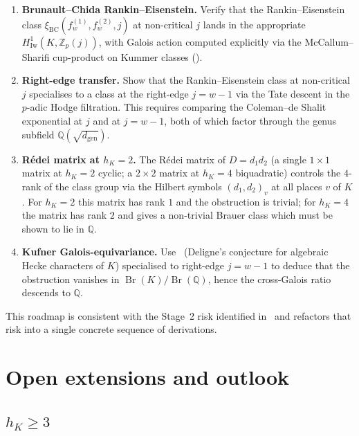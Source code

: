 \documentclass[11pt,a4paper]{amsart}
\theoremstyle{plain}
\theoremstyle{definition}
\DeclareMathOperator{\Br}{Br}
\newcommand{\Q}{\mathbb{Q}}
\newcommand{\fl}[2]{f_{#1}^{(#2)}}
\newcommand{\dgen}{d_{\mathrm{gen}}}
\begin{document}
\begin{enumerate}[leftmargin=2em]
\item \textbf{Brunault--Chida Rankin--Eisenstein.} Verify that the
  Rankin--Eisenstein class
  $\xi_{\mathrm{BC}}(\fl{w}{1}, \fl{w}{2}, j)$ at non-critical $j$
  lands in the appropriate $H^1_{\mathrm{Iw}}(K, \mathbb{Z}_p(j))$, with
  Galois action computed explicitly via the McCallum--Sharifi cup-product
  on Kummer classes (\cite[\S 5.2]{BrunaultChida2015}).
\item \textbf{Right-edge transfer.} Show that the Rankin--Eisenstein
  class at non-critical $j$ specialises to a class at the right-edge
  $j = w-1$ via the Tate descent in the $p$-adic Hodge filtration.
  This requires comparing the Coleman--de Shalit
  exponential at $j$ and at $j = w-1$, both of which factor
  through the genus subfield $\Q(\sqrt{\dgen})$.
\item \textbf{R\'edei matrix at $h_K = 2$.} The R\'edei matrix of
  $D = d_1 d_2$ (a single $1 \times 1$ matrix at $h_K = 2$ cyclic; a
  $2 \times 2$ matrix at $h_K = 4$ biquadratic) controls the
  $4$-rank of the class group via the Hilbert symbols
  $(d_1, d_2)_v$ at all places $v$ of $K$.  For $h_K = 2$ this matrix
  has rank $1$ and the obstruction is trivial; for $h_K = 4$ the matrix
  has rank $2$ and gives a non-trivial Brauer class which must be
  shown to lie in $\Q$.
\item \textbf{Kufner Galois-equivariance.} Use~\cite[Thm.~2.3]{Kufner2024}
  (Deligne's conjecture for algebraic Hecke characters of $K$)
  specialised to right-edge $j = w-1$ to deduce that the obstruction
  vanishes in $\Br(K) / \Br(\Q)$, hence the cross-Galois ratio descends
  to $\Q$.
\end{enumerate}

This roadmap is consistent with the Stage~2 risk identified
in~\cite[\S 6]{Remondiere2026P6} and refactors that risk into a
single concrete sequence of derivations.

\section{Open extensions and outlook}\label{sec:open}

\subsection{$h_K \ge 3$}
\end{document}
